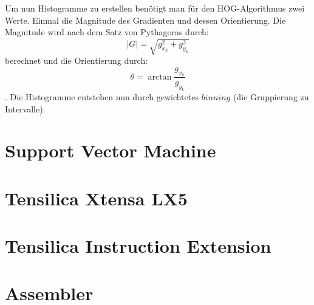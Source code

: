 Um nun Histogramme zu erstellen benötigt man für den HOG-Algorithmus zwei Werte. Einmal die Magnitude des Gradienten und dessen Orientierung.
Die Magnitude wird nach dem Satz von Pythagoras durch:
$$ \lvert G \rvert=\sqrt{g_{x_k}^{2}+g_{y_k}^{2}} $$
berechnet und die Orientierung durch:
$$ \theta=\arctan\frac{g_{x_k}}{g_{y_k}} $$.
Die Histogramme entstehen nun durch gewichtetes $binning$ (die Gruppierung zu Intervalle). 

\section{Support Vector Machine}
\label{sec:grundlagensvm}

\section{Tensilica Xtensa LX5}
\label{sec:grundlagenlx5}

\section{Tensilica Instruction Extension}
\label{sec:grundlagentie}

\section{Assembler}
\label{sec:grundlagenassembler}				